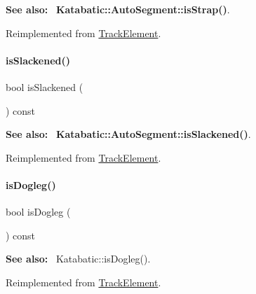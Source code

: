 {\bfseries See also\+:}~ \textbf{ Katabatic\+::\+Auto\+Segment\+::is\+Strap()}. 

Reimplemented from \hyperlink{classKite_1_1TrackElement_a62d61c231cf404a814ae37665fa8164f}{Track\+Element}.

\mbox{\label{classKite_1_1TrackSegment_a782cff57d3fe10e758d19ee65a06643d}} 
\paragraph{\texorpdfstring{is\+Slackened()}{isSlackened()}}
{\footnotesize\ttfamily bool is\+Slackened (\begin{DoxyParamCaption}{ }\end{DoxyParamCaption}) const\hspace{0.3cm}{\ttfamily [virtual]}}

{\bfseries See also\+:}~ \textbf{ Katabatic\+::\+Auto\+Segment\+::is\+Slackened()}. 

Reimplemented from \hyperlink{classKite_1_1TrackElement_a782cff57d3fe10e758d19ee65a06643d}{Track\+Element}.

\mbox{\label{classKite_1_1TrackSegment_a75d91371e5281dd21f60ff39ae70a3e5}} 
\paragraph{\texorpdfstring{is\+Dogleg()}{isDogleg()}}
{\footnotesize\ttfamily bool is\+Dogleg (\begin{DoxyParamCaption}{ }\end{DoxyParamCaption}) const\hspace{0.3cm}{\ttfamily [virtual]}}

{\bfseries See also\+:}~ Katabatic\+::is\+Dogleg(). 

Reimplemented from \hyperlink{classKite_1_1TrackElement_a75d91371e5281dd21f60ff39ae70a3e5}{Track\+Element}.

\mbox{\label{classKite_1_1TrackSegment_aa0bb6f1592688e942ff67e0ac318a4fd}} 
